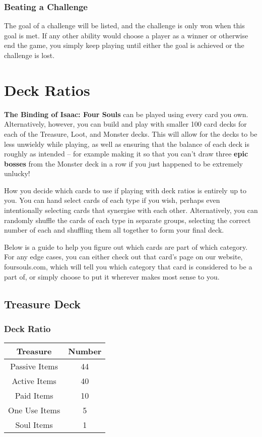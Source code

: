 \documentclass[10pt, a4paper, twoside]{article} %
\begin{document}
    \subsubsection*{Beating a Challenge}
    The goal of a challenge will be listed, and the challenge is only won when this goal is met. If any other ability would choose a player as a winner or otherwise end the game, you simply keep playing until either the goal is achieved or the challenge is lost.

    \section{Deck Ratios}
    \textbf{The Binding of Isaac: Four Souls} can be played using every card you own. Alternatively, however, you can build and play with smaller 100 card decks for each of the Treasure, Loot, and Monster decks. This will allow for the decks to be less unwieldy while playing, as well as ensuring that the balance of each deck is roughly as intended – for example making it so that you can’t draw three \textbf{epic bosses} from the Monster deck in a row if you just happened to be extremely unlucky!

    How you decide which cards to use if playing with deck ratios is entirely up to you. You can hand select cards of each type if you wish, perhaps even intentionally selecting cards that synergise with each other. Alternatively, you can randomly shuffle the cards of each type in separate groups, selecting the correct number of each and shuffling them all together to form your final deck.

    Below is a guide to help you figure out which cards are part of which category. For any edge cases, you can either check out that card’s page on our website, foursouls.com, which will tell you which category that card is considered to be a part of, or simply choose to put it wherever makes most sense to you.

    \subsection{Treasure Deck}
    \subsubsection*{Deck Ratio}
    \begin{tabular}{ | c | c | }
        \hline
        \textbf{Treasure} & \textbf{Number}\\
        \hline 
        Passive Items & 44\\
        Active Items & 40\\
        Paid Items & 10\\
        One Use Items & 5\\
        Soul Items & 1\\
        \hline
    \end{tabular}
\end{document}
